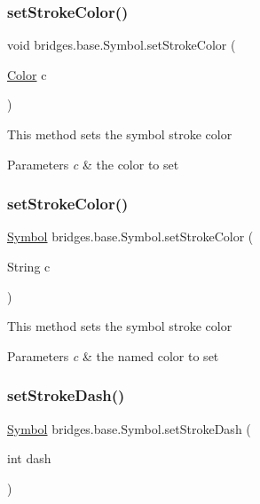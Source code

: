 \subsubsection{\texorpdfstring{setStrokeColor()}{setStrokeColor()}\hspace{0.1cm}{\footnotesize\ttfamily [1/2]}}
{\footnotesize\ttfamily void bridges.\+base.\+Symbol.\+set\+Stroke\+Color (\begin{DoxyParamCaption}\item[{\mbox{\hyperlink{classbridges_1_1base_1_1_color}{Color}}}]{c }\end{DoxyParamCaption})}

This method sets the symbol stroke color


\begin{DoxyParams}{Parameters}
{\em c} & the color to set \\
\hline
\end{DoxyParams}
\mbox{\label{classbridges_1_1base_1_1_symbol_ae9aa7d4e9b497875017a9b6e0eaab181}} 
\subsubsection{\texorpdfstring{setStrokeColor()}{setStrokeColor()}\hspace{0.1cm}{\footnotesize\ttfamily [2/2]}}
{\footnotesize\ttfamily \mbox{\hyperlink{classbridges_1_1base_1_1_symbol}{Symbol}} bridges.\+base.\+Symbol.\+set\+Stroke\+Color (\begin{DoxyParamCaption}\item[{String}]{c }\end{DoxyParamCaption})}

This method sets the symbol stroke color


\begin{DoxyParams}{Parameters}
{\em c} & the named color to set \\
\hline
\end{DoxyParams}
\mbox{\label{classbridges_1_1base_1_1_symbol_ad36224ec7cb588dbbaa8040ef59ffbfc}} 
\subsubsection{\texorpdfstring{setStrokeDash()}{setStrokeDash()}}
{\footnotesize\ttfamily \mbox{\hyperlink{classbridges_1_1base_1_1_symbol}{Symbol}} bridges.\+base.\+Symbol.\+set\+Stroke\+Dash (\begin{DoxyParamCaption}\item[{int}]{dash }\end{DoxyParamCaption})}

